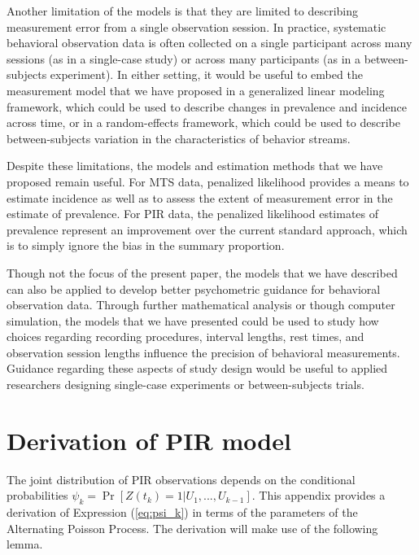 \documentclass[man, noextraspace, floatsintext]{apa6}\usepackage[]{graphicx}\usepackage[]{color}
\newcommand{\bibfile}{Behavioral_observation-APP}
\begin{document}
Another limitation of the models is that they are limited to describing measurement error from a single observation session. In practice, systematic behavioral observation data is often collected on a single participant across many sessions (as in a single-case study) or across many participants (as in a between-subjects experiment). In either setting, it would be useful to embed the measurement model that we have proposed in a generalized linear modeling framework, which could be used to describe changes in prevalence and incidence across time, or in a random-effects framework, which could be used to describe between-subjects variation in the characteristics of behavior streams.

Despite these limitations, the models and estimation methods that we have proposed remain useful. For MTS data, penalized likelihood provides a means to estimate incidence as well as to assess the extent of measurement error in the estimate of prevalence. For PIR data, the penalized likelihood estimates of prevalence represent an improvement over the current standard approach, which is to simply ignore the bias in the summary proportion. 

Though not the focus of the present paper, the models that we have described can also be applied to develop better psychometric guidance for behavioral observation data. Through further mathematical analysis or though computer simulation, the models that we have presented could be used to study how choices regarding recording procedures, interval lengths, rest times, and observation session lengths influence the precision of behavioral measurements. Guidance regarding these aspects of study design would be useful to applied researchers designing single-case experiments or between-subjects trials.



 
\appendix

\section{Derivation of PIR model}
\label{app:PIR_derivation}

The joint distribution of PIR observations depends on the conditional probabilities $\psi_k = \Pr\left[ Z(t_k) = 1 \left| U_1,...,U_{k-1}\right.\right]$. 
This appendix provides a derivation of Expression (\ref{eq:psi_k}) in terms of the parameters of the Alternating Poisson Process. The derivation will make use of the following lemma.
\end{document}
